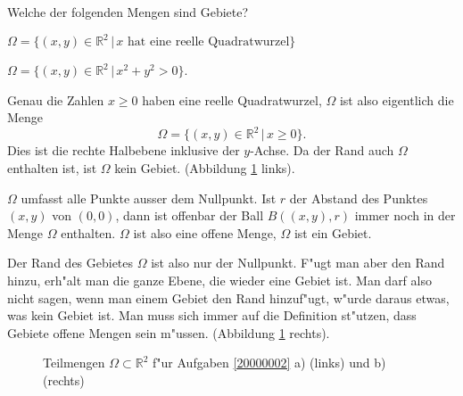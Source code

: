Welche der folgenden Mengen sind Gebiete?
\begin{teilaufgaben}
\item $\Omega=\{(x,y)\in\mathbb R^2\,|\, \text{$x$ hat eine reelle Quadratwurzel}\}$
\item $\Omega=\{(x,y)\in\mathbb R^2\,|\, x^2+y^2>0\}$.
\end{teilaufgaben}


\begin{loesung}
\begin{teilaufgaben}
\item
Genau die Zahlen $x\ge 0$ haben eine reelle Quadratwurzel, $\Omega$ ist
also eigentlich die Menge
\[
\Omega=\{(x,y)\in\mathbb R^2\,|\, x\ge 0\}.
\]
Dies ist die rechte Halbebene inklusive der $y$-Achse. Da der Rand
auch $\Omega$ enthalten ist, ist $\Omega$ kein Gebiet.
(Abbildung \ref{20000002:fig} links).
\item
$\Omega$ umfasst alle Punkte ausser dem Nullpunkt. Ist $r$ der Abstand
des Punktes $(x,y)$ von $(0,0)$, dann ist offenbar der Ball $B((x,y),r)$
immer noch in der Menge $\Omega$ enthalten. $\Omega$ ist also eine offene
Menge, $\Omega$ ist ein Gebiet.

Der Rand des Gebietes $\Omega$ ist also nur der Nullpunkt. F"ugt man
aber den Rand hinzu, erh"alt man die ganze Ebene, die wieder eine
Gebiet ist. Man darf also nicht sagen, wenn man einem Gebiet den Rand
hinzuf"ugt, w"urde daraus etwas, was kein Gebiet ist. Man muss sich immer
auf die Definition st"utzen, dass Gebiete offene Mengen sein m"ussen.
(Abbildung \ref{20000002:fig} rechts).
\qedhere
\end{teilaufgaben}
\begin{figure}
\begin{center}
\qquad
{}
\end{center}
\caption{Teilmengen $\Omega\subset\mathbb R^2$ f"ur Aufgaben \ref{20000002} a)
(links) 
und b) (rechts)\label{20000002:fig}}
\end{figure}
\end{loesung}
